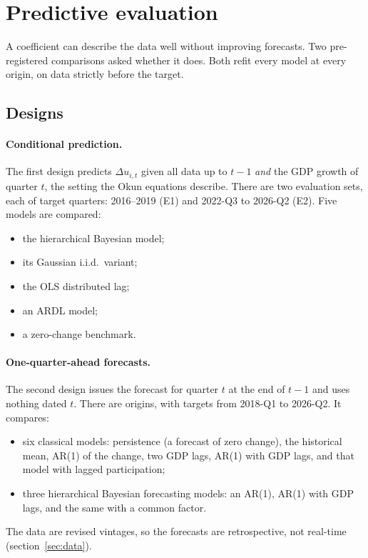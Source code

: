 \section{Predictive evaluation}\label{sec:prediction}

A coefficient can describe the data well without improving forecasts. Two pre-registered
comparisons asked whether it does. Both refit every model at every origin, on data strictly
before the target.

\subsection{Designs}

\paragraph{Conditional prediction.} The first design predicts $\Delta u_{i,t}$ given all
data up to $t-1$ \emph{and} the GDP growth of quarter $t$, the setting the Okun equations
describe. There are two evaluation sets, each of  target quarters:
2016--2019 (E1)
and 2022-Q3 to 2026-Q2 (E2). Five models are compared:
\begin{itemize}
  \item the hierarchical Bayesian model;
  \item its Gaussian i.i.d.\ variant;
  \item the OLS distributed lag;
  \item an ARDL model;
  \item a zero-change benchmark.
\end{itemize}

\paragraph{One-quarter-ahead forecasts.} The second design issues the forecast for quarter
$t$ at the end of $t-1$ and uses nothing dated $t$. There are  origins,
with targets from
2018-Q1 to 2026-Q2. It compares:
\begin{itemize}
  \item six classical models: persistence (a forecast of zero change), the historical mean, AR(1) of the change, two
    GDP lags, AR(1) with GDP lags, and that model with lagged participation;
  \item three hierarchical Bayesian forecasting models: an AR(1), AR(1) with GDP lags, and
    the same with a common factor.
\end{itemize}
The data are revised vintages, so the forecasts are retrospective, not real-time
(section~\ref{sec:data}).

